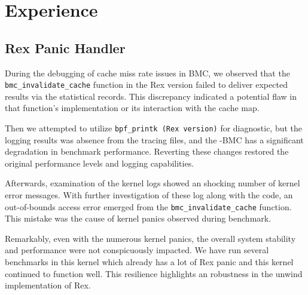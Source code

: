 \section{Experience}
\subsection{Rex Panic Handler}
During the debugging of cache miss rate issues in BMC, we observed that the 
\texttt{bmc\_invalidate\_cache} function in the Rex version failed to deliver expected 
    results via the statistical records. 
This discrepancy indicated a potential flaw in that function's implementation 
    or its interaction with the cache map.
    
    Then we attempted to utilize \texttt{bpf\_printk (Rex version)} for diagnostic, but 
    the logging results was absence from the tracing files, 
    and the \projname{}-BMC has a significant degradation in benchmark performance. 
Reverting these changes restored the original performance levels and logging capabilities.
    
Afterwards, examination of the kernel logs showed an shocking number of kernel error messages. 
With further investigation of these log along with the code, an out-of-bounds access error 
emerged from the \texttt{bmc\_invalidate\_cache} function. 
This mistake was the cause of kernel panics observed during benchmark.
    
Remarkably, even with the numerous kernel panics, the overall system stability 
    and performance were not conspicuously impacted. 
We have run several benchmarks in this kernel which already has a lot of Rex panic 
    and this kernel continued to function well.
This resilience highlights an robustness in the unwind implementation of Rex.

